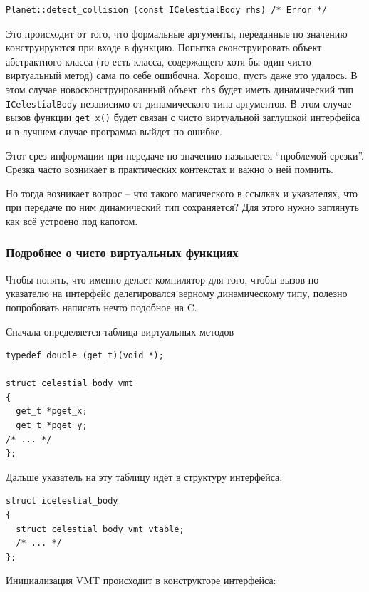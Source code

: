 \documentclass[a4paper,12pt,oneside]{article}
\begin{document}
\begin{lstlisting}
Planet::detect_collision (const ICelestialBody rhs) /* Error */
\end{lstlisting}

Это происходит от того, что формальные аргументы, переданные по значению конструируются при входе в функцию. Попытка сконструировать объект абстрактного класса (то есть класса, содержащего хотя бы один чисто виртуальный метод) сама по себе ошибочна. Хорошо, пусть даже это удалось. В этом случае новосконструированный объект \lstinline!rhs! будет иметь динамический тип \lstinline!ICelestialBody! независимо от динамического типа аргументов. В этом случае вызов функции \lstinline!get_x()! будет связан с чисто виртуальной заглушкой интерфейса и в лучшем случае программа выйдет по ошибке. 

Этот срез информации при передаче по значению называется ``проблемой срезки''. Срезка часто возникает в практических контекстах и важно о ней помнить.

Но тогда возникает вопрос -- что такого магического в ссылках и указателях, что при передаче по ним динамический тип сохраняется? Для этого нужно заглянуть как всё устроено под капотом.

\subsubsection{Подробнее о чисто виртуальных функциях}\label{VirtualUnderHood}

Чтобы понять, что именно делает компилятор для того, чтобы вызов по указателю на интерфейс делегировался верному динамическому типу, полезно попробовать написать нечто подобное на C.

Сначала определяется таблица виртуальных методов

\begin{lstlisting}
typedef double (get_t)(void *);

struct celestial_body_vmt
{
  get_t *pget_x;
  get_t *pget_y;
/* ... */
};
\end{lstlisting}

Дальше указатель на эту таблицу идёт в структуру интерфейса:

\begin{lstlisting}
struct icelestial_body
{
  struct celestial_body_vmt vtable;
  /* ... */
};
\end{lstlisting}

Инициализация VMT происходит в конструкторе интерфейса:
\end{document}
